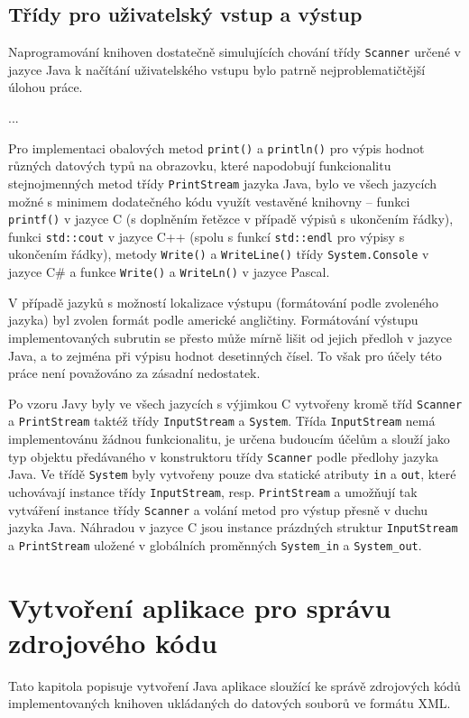 \documentclass[onepage, a4paper, 12pt]{bakalarka}
\begin{document}
\section{Třídy pro uživatelský vstup a výstup}
Naprogramování knihoven dostatečně simulujících chování třídy \texttt{Scanner} určené v jazyce Java k načítání uživatelského vstupu bylo patrně nejproblematičtější úlohou práce.\par
...\par %
Pro implementaci obalových metod \texttt{print()} a \texttt{println()} pro výpis hodnot různých datových typů na obrazovku, které napodobují funkcionalitu stejnojmenných metod třídy \texttt{PrintStream} jazyka Java, bylo ve všech jazycích možné s minimem dodatečného kódu využít vestavěné knihovny -- funkci \texttt{printf()} v jazyce C (s doplněním řetězce  v případě výpisů s ukončením řádky), funkci \texttt{std::cout} v jazyce C++ (spolu s funkcí \texttt{std::endl} pro výpisy s ukončením řádky), metody \texttt{Write()} a \texttt{WriteLine()} třídy \texttt{System.Console} v jazyce C\# a funkce \texttt{Write()} a \texttt{WriteLn()} v jazyce Pascal.\par
V případě jazyků s možností lokalizace výstupu (formátování podle zvoleného jazyka) byl zvolen formát podle americké angličtiny. Formátování výstupu implementovaných subrutin se přesto může mírně lišit od jejich předloh v jazyce Java, a to zejména při výpisu hodnot desetinných čísel. To však pro účely této práce není považováno za zásadní nedostatek.\par
Po vzoru Javy byly ve všech jazycích s výjimkou C vytvořeny kromě tříd \texttt{Scanner} a \texttt{PrintStream} taktéž třídy \texttt{InputStream} a \texttt{System}. Třída \texttt{InputStream} nemá implementovánu žádnou funkcionalitu, je určena budoucím účelům a slouží jako typ objektu předávaného v konstruktoru třídy \texttt{Scanner} podle předlohy jazyka Java. Ve třídě \texttt{System} byly vytvořeny pouze dva statické atributy \texttt{in} a \texttt{out}, které uchovávají instance třídy \texttt{InputStream}, resp. \texttt{PrintStream} a umožňují tak vytváření instance třídy \texttt{Scanner} a volání metod pro výstup přesně v duchu jazyka Java. Náhradou v jazyce C jsou instance prázdných struktur \texttt{InputStream} a \texttt{PrintStream} uložené v globálních proměnných \texttt{System\_in} a \texttt{System\_out}.

\chapter{Vytvoření aplikace pro správu zdrojového kódu}
Tato kapitola popisuje vytvoření Java aplikace sloužící ke správě zdrojových kódů implementovaných knihoven ukládaných do datových souborů ve formátu XML.
\end{document}
